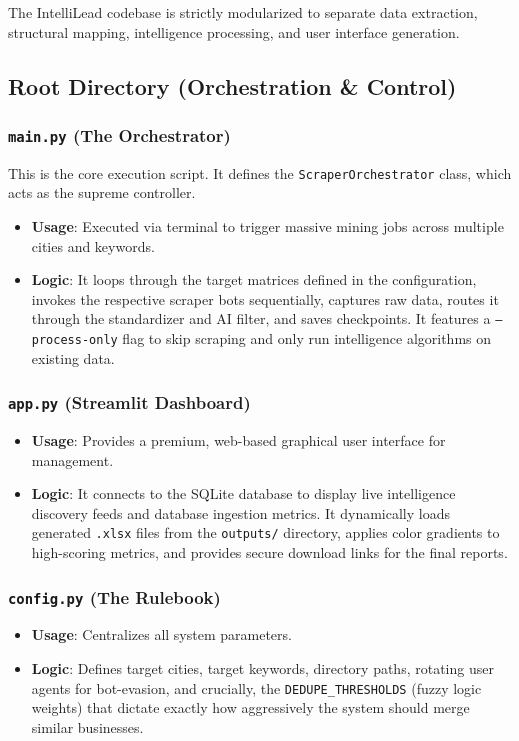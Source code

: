 \documentclass[12pt,a4paper]{article}
\begin{document}
The IntelliLead codebase is strictly modularized to separate data extraction, structural mapping, intelligence processing, and user interface generation.

\subsection{Root Directory (Orchestration \& Control)}

\subsubsection{\texttt{main.py} (The Orchestrator)}
This is the core execution script. It defines the \texttt{ScraperOrchestrator} class, which acts as the supreme controller. 
\begin{itemize}
    \item \textbf{Usage}: Executed via terminal to trigger massive mining jobs across multiple cities and keywords.
    \item \textbf{Logic}: It loops through the target matrices defined in the configuration, invokes the respective scraper bots sequentially, captures raw data, routes it through the standardizer and AI filter, and saves checkpoints. It features a \texttt{--process-only} flag to skip scraping and only run intelligence algorithms on existing data.
\end{itemize}

\subsubsection{\texttt{app.py} (Streamlit Dashboard)}
\begin{itemize}
    \item \textbf{Usage}: Provides a premium, web-based graphical user interface for management.
    \item \textbf{Logic}: It connects to the SQLite database to display live intelligence discovery feeds and database ingestion metrics. It dynamically loads generated \texttt{.xlsx} files from the \texttt{outputs/} directory, applies color gradients to high-scoring metrics, and provides secure download links for the final reports.
\end{itemize}

\subsubsection{\texttt{config.py} (The Rulebook)}
\begin{itemize}
    \item \textbf{Usage}: Centralizes all system parameters.
    \item \textbf{Logic}: Defines target cities, target keywords, directory paths, rotating user agents for bot-evasion, and crucially, the \texttt{DEDUPE\_THRESHOLDS} (fuzzy logic weights) that dictate exactly how aggressively the system should merge similar businesses.
\end{itemize}
\end{document}

